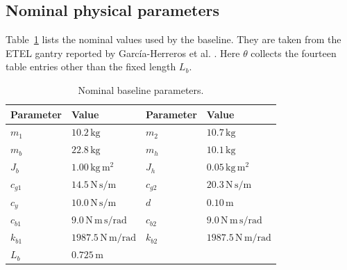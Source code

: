 \subsection{Nominal physical parameters}\label{app:params}
Table~\ref{tab:nominal_parameters} lists the nominal values used by the baseline.
They are taken from the ETEL gantry reported by Garc\'ia-Herreros et al.
\cite[Table~I]{garcia2013model}. Here $\theta$ collects the fourteen table
entries other than the fixed length $L_b$.
\begin{table}[t]
\caption{Nominal baseline parameters.}
\label{tab:nominal_parameters}
\centering
\footnotesize
\begin{tabular}{@{}ll@{\qquad}ll@{}}
\toprule
Parameter & Value & Parameter & Value \\
\midrule
$m_1$ & $10.2\,\mathrm{kg}$ & $m_2$ & $10.7\,\mathrm{kg}$ \\
$m_b$ & $22.8\,\mathrm{kg}$ & $m_h$ & $10.1\,\mathrm{kg}$ \\
$J_b$ & $1.00\,\mathrm{kg\,m^2}$ & $J_h$ & $0.05\,\mathrm{kg\,m^2}$ \\
$c_{g1}$ & $14.5\,\mathrm{N\,s/m}$ & $c_{g2}$ & $20.3\,\mathrm{N\,s/m}$ \\
$c_y$ & $10.0\,\mathrm{N\,s/m}$ & $d$ & $0.10\,\mathrm{m}$ \\
$c_{b1}$ & $9.0\,\mathrm{N\,m\,s/rad}$ & $c_{b2}$ & $9.0\,\mathrm{N\,m\,s/rad}$ \\
$k_{b1}$ & $1987.5\,\mathrm{N\,m/rad}$ & $k_{b2}$ & $1987.5\,\mathrm{N\,m/rad}$ \\
$L_b$ & $0.725\,\mathrm{m}$ & & \\
\bottomrule
\end{tabular}
\end{table}

